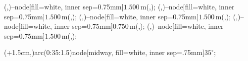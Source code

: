 {{		 (\ax,\bot)--node[fill=white, inner sep=0.75mm]{$1.500\,\text{m}$}(\cx,\bot);
		 (\cx,\bot)--node[fill=white, inner sep=0.75mm]{$1.500\,\text{m}$}(\bcmidx,\bot);
		 (\bcmidx,\bot)--node[fill=white, inner sep=0.75mm]{$1.500\,\text{m}$}(\bx,\bot);
		 (\ax-1.5cm,\cy)--node[fill=white, inner sep=0.75mm]{$0.750\,\text{m}$}(\ax-1.5cm,\acy);
		 (\ax-1.5cm,\acy)--node[fill=white, inner sep=0.75mm]{$1.500\,\text{m}$}(\ax-1.5cm,\ay);
		
		 (\bcmidx+1.5cm,\bcmidy)arc(0:35:1.5)node[midway, fill=white, inner sep=.75mm]{$35^\circ$};

	}
}
